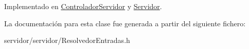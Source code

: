 \-Implementado en \hyperlink{classControladorServidor_a45d1f810987e11a222986ecf588ac497}{\-Controlador\-Servidor} y \hyperlink{classServidor_a2eb01d909e9206d9ab3722ccb1e38795}{\-Servidor}.



\-La documentación para esta clase fue generada a partir del siguiente fichero\-:\begin{DoxyCompactItemize}
\item 
servidor/servidor/\-Resolvedor\-Entradas.\-h\end{DoxyCompactItemize}
